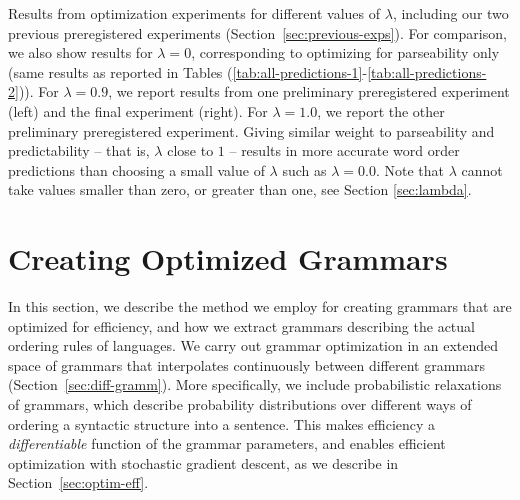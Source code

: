\documentclass[10pt,twoside,lineno]{article}
\begin{document}
\begin{table}[hbt!]
\begin{center}
	\end{center}
	\caption{Results from optimization experiments for different values of $\lambda$, including our two previous preregistered experiments (Section~\ref{sec:previous-exps}). For comparison, we also show results for $\lambda=0$, corresponding to optimizing for parseability only (same results as reported in Tables (\ref{tab:all-predictions-1}-\ref{tab:all-predictions-2})). For $\lambda=0.9$, we report results from one preliminary preregistered experiment (left) and the final experiment (right). For $\lambda=1.0$, we report the other preliminary preregistered experiment.
Giving similar weight to parseability and predictability -- that is, $\lambda$ close to $1$ -- results in more accurate word order predictions than choosing a small value of $\lambda$ such as $\lambda=0.0$. Note that $\lambda$ cannot take values smaller than zero, or greater than one, see Section \ref{sec:lambda}.
}\label{table:corr-resu-previous}
\end{table}



\section{Creating Optimized Grammars}

In this section, we describe the method we employ for creating grammars that are optimized for efficiency, and how we extract grammars describing the actual ordering rules of languages.
We carry out grammar optimization in an extended space of grammars that interpolates continuously between different grammars (Section~\ref{sec:diff-gramm}).
More specifically, we include probabilistic relaxations of grammars, which describe probability distributions over different ways of ordering a syntactic structure into a sentence.
This makes efficiency a \emph{differentiable} function of the grammar parameters, and enables efficient optimization with stochastic gradient descent, as we describe in Section~\ref{sec:optim-eff}.
\end{document}
